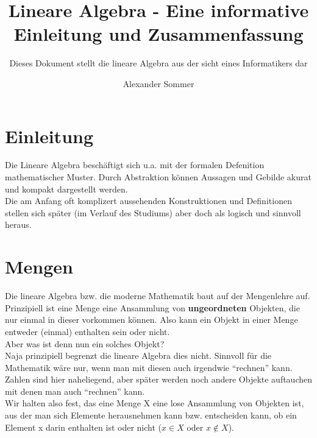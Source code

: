 \documentclass[parskip=full]{scrartcl}
\title{Lineare Algebra - Eine informative Einleitung und Zusammenfassung}
\subtitle{Dieses Dokument stellt die lineare Algebra aus der sicht eines Informatikers dar}
\author{Alexander Sommer}
\begin{document}
\maketitle

\section{Einleitung}
    Die Lineare Algebra beschäftigt sich u.a. mit der formalen Defenition mathematischer Muster.
    Durch Abstraktion können Aussagen und Gebilde akurat und kompakt dargestellt werden.
    \\Die am Anfang oft komplizert aussehenden Konstruktionen und Definitionen stellen sich später
    (im Verlauf des Studiums) aber doch als logisch und sinnvoll heraus.

\section{Mengen}
    Die lineare Algebra bzw. die moderne Mathematik baut auf der Mengenlehre auf.
    Prinzipiell ist eine Menge eine Ansammlung von \textbf{ungeordneten} Objekten, die nur einmal in dieser vorkommen können.
    Also kann ein Objekt in einer Menge entweder (einmal) enthalten sein oder nicht.
    \\Aber was ist denn nun ein solches Objekt?
    \\Naja prinzipiell begrenzt die lineare Algebra dies nicht.
    Sinnvoll für die Mathematik wäre nur, wenn man mit diesen auch irgendwie \enquote{rechnen} kann. 
    Zahlen sind hier naheliegend, aber später werden noch andere Objekte auftauchen mit denen man auch \enquote{rechnen} kann.
    \\Wir halten also fest, das eine Menge X eine lose Ansammlung von Objekten ist, 
    aus der man sich Elemente herausnehmen kann bzw. entscheiden kann, ob ein Element x darin enthalten ist oder nicht (\(x \in X\) oder \(x\notin X\)).
    
\end{document}

